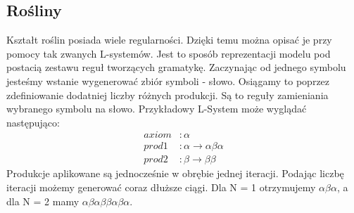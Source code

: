 \documentclass[inz,longabstract]{iithesis}
\begin{document}
        \subsection{Rośliny}
            Kształt roślin posiada wiele regularności. Dzięki temu można opisać je przy pomocy tak zwanych L-systemów. Jest to sposób reprezentacji modelu pod postacią zestawu reguł tworzących gramatykę. Zaczynając od jednego symbolu jesteśmy wstanie wygenerować zbiór symboli - słowo. Osiągamy to poprzez zdefiniowanie dodatniej liczby różnych produkcji. Są to reguły zamieniania wybranego symbolu na słowo. Przykładowy L-System może wyglądać następująco:
            \begin{align*}
                axiom &: \alpha \\
                prod1 &: \alpha \rightarrow \alpha\beta\alpha \\
                prod2 &: \beta \rightarrow \beta\beta
            \end{align*}
            Produkcje aplikowane są jednocześnie w obrębie jednej iteracji. Podając liczbę iteracji możemy generować coraz dłuższe ciągi. Dla N = 1 otrzymujemy $\alpha\beta\alpha$, a dla N = 2 mamy $\alpha\beta\alpha\beta\beta\alpha\beta\alpha$.
            
\end{document}
